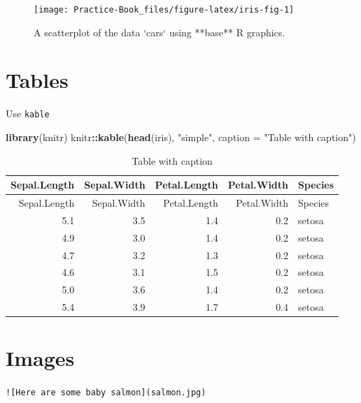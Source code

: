 \documentclass[
]{book}
\newenvironment{Shaded}{\begin{snugshade}}{\end{snugshade}}
\newcommand{\DataTypeTok}[1]{\textcolor[rgb]{0.13,0.29,0.53}{#1}}
\newcommand{\KeywordTok}[1]{\textcolor[rgb]{0.13,0.29,0.53}{\textbf{#1}}}
\newcommand{\NormalTok}[1]{#1}
\newcommand{\OperatorTok}[1]{\textcolor[rgb]{0.81,0.36,0.00}{\textbf{#1}}}
\newcommand{\StringTok}[1]{\textcolor[rgb]{0.31,0.60,0.02}{#1}}
\begin{document}
\begin{figure}

{\centering \texttt{[image: Practice-Book\_files/figure-latex/iris-fig-1]} 

}

\caption{A scatterplot of the data `cars` using **base** R graphics. }\label{fig:iris-fig}
\end{figure}

\hypertarget{tables}{%
\section{Tables}\label{tables}}

Use \texttt{kable}

\begin{Shaded}
\begin{Highlighting}[]
\KeywordTok{library}\NormalTok{(knitr)}
\NormalTok{knitr}\OperatorTok{::}\KeywordTok{kable}\NormalTok{(}\KeywordTok{head}\NormalTok{(iris), }\StringTok{"simple"}\NormalTok{,  }\DataTypeTok{caption =} \StringTok{"Table with caption"}\NormalTok{)}
\end{Highlighting}
\end{Shaded}

\begin{longtable}[]{@{}rrrrl@{}}
\caption{\label{tab:iris-table}Table with caption}\tabularnewline
\toprule
Sepal.Length & Sepal.Width & Petal.Length & Petal.Width & Species\tabularnewline
\midrule
\endfirsthead
\toprule
Sepal.Length & Sepal.Width & Petal.Length & Petal.Width & Species\tabularnewline
\midrule
\endhead
5.1 & 3.5 & 1.4 & 0.2 & setosa\tabularnewline
4.9 & 3.0 & 1.4 & 0.2 & setosa\tabularnewline
4.7 & 3.2 & 1.3 & 0.2 & setosa\tabularnewline
4.6 & 3.1 & 1.5 & 0.2 & setosa\tabularnewline
5.0 & 3.6 & 1.4 & 0.2 & setosa\tabularnewline
5.4 & 3.9 & 1.7 & 0.4 & setosa\tabularnewline
\bottomrule
\end{longtable}

\hypertarget{images}{%
\section{Images}\label{images}}

\texttt{!{[}Here\ are\ some\ baby\ salmon{]}(salmon.jpg)}
\end{document}
